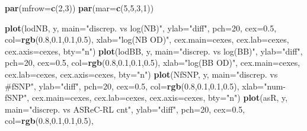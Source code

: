 \documentclass[]{article}
\newenvironment{Shaded}{\begin{snugshade}}{\end{snugshade}}
\newcommand{\KeywordTok}[1]{\textcolor[rgb]{0.13,0.29,0.53}{\textbf{#1}}}
\newcommand{\DataTypeTok}[1]{\textcolor[rgb]{0.13,0.29,0.53}{#1}}
\newcommand{\DecValTok}[1]{\textcolor[rgb]{0.00,0.00,0.81}{#1}}
\newcommand{\FloatTok}[1]{\textcolor[rgb]{0.00,0.00,0.81}{#1}}
\newcommand{\StringTok}[1]{\textcolor[rgb]{0.31,0.60,0.02}{#1}}
\newcommand{\NormalTok}[1]{#1}
\begin{document}
\begin{Shaded}
\begin{Highlighting}[]
\KeywordTok{par}\NormalTok{(}\DataTypeTok{mfrow=}\KeywordTok{c}\NormalTok{(}\DecValTok{2}\NormalTok{,}\DecValTok{3}\NormalTok{))}
\KeywordTok{par}\NormalTok{(}\DataTypeTok{mar=}\KeywordTok{c}\NormalTok{(}\DecValTok{5}\NormalTok{,}\DecValTok{5}\NormalTok{,}\DecValTok{3}\NormalTok{,}\DecValTok{1}\NormalTok{))}

\KeywordTok{plot}\NormalTok{(lodNB, y, }\DataTypeTok{main=}\StringTok{"discrep. vs log(NB)"}\NormalTok{, }\DataTypeTok{ylab=}\StringTok{"diff"}\NormalTok{, }\DataTypeTok{pch=}\DecValTok{20}\NormalTok{, }\DataTypeTok{cex=}\FloatTok{0.5}\NormalTok{, }\DataTypeTok{col=}\KeywordTok{rgb}\NormalTok{(}\FloatTok{0.8}\NormalTok{,}\FloatTok{0.1}\NormalTok{,}\FloatTok{0.1}\NormalTok{,}\FloatTok{0.5}\NormalTok{), }
     \DataTypeTok{xlab=}\StringTok{"log(NB OD)"}\NormalTok{, }\DataTypeTok{cex.main=}\NormalTok{cexes,  }\DataTypeTok{cex.lab=}\NormalTok{cexes, }\DataTypeTok{cex.axis=}\NormalTok{cexes, }\DataTypeTok{bty=}\StringTok{"n"}\NormalTok{)}
\KeywordTok{plot}\NormalTok{(lodBB, y, }\DataTypeTok{main=}\StringTok{"discrep. vs log(BB)"}\NormalTok{, }\DataTypeTok{ylab=}\StringTok{"diff"}\NormalTok{, }\DataTypeTok{pch=}\DecValTok{20}\NormalTok{, }\DataTypeTok{cex=}\FloatTok{0.5}\NormalTok{, }\DataTypeTok{col=}\KeywordTok{rgb}\NormalTok{(}\FloatTok{0.8}\NormalTok{,}\FloatTok{0.1}\NormalTok{,}\FloatTok{0.1}\NormalTok{,}\FloatTok{0.5}\NormalTok{),  }
     \DataTypeTok{xlab=}\StringTok{"log(BB OD)"}\NormalTok{, }\DataTypeTok{cex.main=}\NormalTok{cexes, }\DataTypeTok{cex.lab=}\NormalTok{cexes, }\DataTypeTok{cex.axis=}\NormalTok{cexes, }\DataTypeTok{bty=}\StringTok{"n"}\NormalTok{)}
\KeywordTok{plot}\NormalTok{(NfSNP, y, }\DataTypeTok{main=}\StringTok{"discrep. vs #fSNP"}\NormalTok{, }\DataTypeTok{ylab=}\StringTok{"diff"}\NormalTok{, }\DataTypeTok{pch=}\DecValTok{20}\NormalTok{, }\DataTypeTok{cex=}\FloatTok{0.5}\NormalTok{, }\DataTypeTok{col=}\KeywordTok{rgb}\NormalTok{(}\FloatTok{0.8}\NormalTok{,}\FloatTok{0.1}\NormalTok{,}\FloatTok{0.1}\NormalTok{,}\FloatTok{0.5}\NormalTok{), }
     \DataTypeTok{xlab=}\StringTok{"num-fSNP"}\NormalTok{, }\DataTypeTok{cex.main=}\NormalTok{cexes, }\DataTypeTok{cex.lab=}\NormalTok{cexes, }\DataTypeTok{cex.axis=}\NormalTok{cexes, }\DataTypeTok{bty=}\StringTok{"n"}\NormalTok{)}
\KeywordTok{plot}\NormalTok{(asR, y, }\DataTypeTok{main=}\StringTok{"discrep. vs ASReC-RL cnt"}\NormalTok{, }\DataTypeTok{ylab=}\StringTok{"diff"}\NormalTok{,  }\DataTypeTok{pch=}\DecValTok{20}\NormalTok{, }\DataTypeTok{cex=}\FloatTok{0.5}\NormalTok{, }\DataTypeTok{col=}\KeywordTok{rgb}\NormalTok{(}\FloatTok{0.8}\NormalTok{,}\FloatTok{0.1}\NormalTok{,}\FloatTok{0.1}\NormalTok{,}\FloatTok{0.5}\NormalTok{),}

\end{Highlighting}
\end{Shaded}
\end{document}
